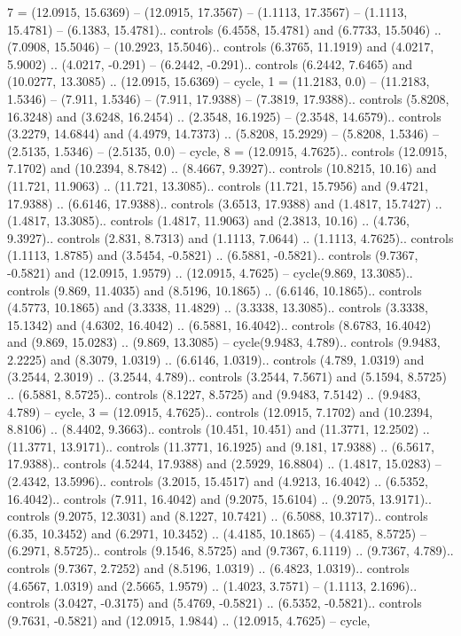 {7} = {(12.0915, 15.6369) -- (12.0915, 17.3567) -- (1.1113, 17.3567) -- (1.1113, 15.4781) -- (6.1383, 15.4781).. controls (6.4558, 15.4781) and (6.7733, 15.5046) .. (7.0908, 15.5046) -- (10.2923, 15.5046).. controls (6.3765, 11.1919) and (4.0217, 5.9002) .. (4.0217, -0.291) -- (6.2442, -0.291).. controls (6.2442, 7.6465) and (10.0277, 13.3085) .. (12.0915, 15.6369) -- cycle},
{1} = {(11.2183, 0.0) -- (11.2183, 1.5346) -- (7.911, 1.5346) -- (7.911, 17.9388) -- (7.3819, 17.9388).. controls (5.8208, 16.3248) and (3.6248, 16.2454) .. (2.3548, 16.1925) -- (2.3548, 14.6579).. controls (3.2279, 14.6844) and (4.4979, 14.7373) .. (5.8208, 15.2929) -- (5.8208, 1.5346) -- (2.5135, 1.5346) -- (2.5135, 0.0) -- cycle},
{8} = {(12.0915, 4.7625).. controls (12.0915, 7.1702) and (10.2394, 8.7842) .. (8.4667, 9.3927).. controls (10.8215, 10.16) and (11.721, 11.9063) .. (11.721, 13.3085).. controls (11.721, 15.7956) and (9.4721, 17.9388) .. (6.6146, 17.9388).. controls (3.6513, 17.9388) and (1.4817, 15.7427) .. (1.4817, 13.3085).. controls (1.4817, 11.9063) and (2.3813, 10.16) .. (4.736, 9.3927).. controls (2.831, 8.7313) and (1.1113, 7.0644) .. (1.1113, 4.7625).. controls (1.1113, 1.8785) and (3.5454, -0.5821) .. (6.5881, -0.5821).. controls (9.7367, -0.5821) and (12.0915, 1.9579) .. (12.0915, 4.7625) -- cycle(9.869, 13.3085).. controls (9.869, 11.4035) and (8.5196, 10.1865) .. (6.6146, 10.1865).. controls (4.5773, 10.1865) and (3.3338, 11.4829) .. (3.3338, 13.3085).. controls (3.3338, 15.1342) and (4.6302, 16.4042) .. (6.5881, 16.4042).. controls (8.6783, 16.4042) and (9.869, 15.0283) .. (9.869, 13.3085) -- cycle(9.9483, 4.789).. controls (9.9483, 2.2225) and (8.3079, 1.0319) .. (6.6146, 1.0319).. controls (4.789, 1.0319) and (3.2544, 2.3019) .. (3.2544, 4.789).. controls (3.2544, 7.5671) and (5.1594, 8.5725) .. (6.5881, 8.5725).. controls (8.1227, 8.5725) and (9.9483, 7.5142) .. (9.9483, 4.789) -- cycle},
{3} = {(12.0915, 4.7625).. controls (12.0915, 7.1702) and (10.2394, 8.8106) .. (8.4402, 9.3663).. controls (10.451, 10.451) and (11.3771, 12.2502) .. (11.3771, 13.9171).. controls (11.3771, 16.1925) and (9.181, 17.9388) .. (6.5617, 17.9388).. controls (4.5244, 17.9388) and (2.5929, 16.8804) .. (1.4817, 15.0283) -- (2.4342, 13.5996).. controls (3.2015, 15.4517) and (4.9213, 16.4042) .. (6.5352, 16.4042).. controls (7.911, 16.4042) and (9.2075, 15.6104) .. (9.2075, 13.9171).. controls (9.2075, 12.3031) and (8.1227, 10.7421) .. (6.5088, 10.3717).. controls (6.35, 10.3452) and (6.2971, 10.3452) .. (4.4185, 10.1865) -- (4.4185, 8.5725) -- (6.2971, 8.5725).. controls (9.1546, 8.5725) and (9.7367, 6.1119) .. (9.7367, 4.789).. controls (9.7367, 2.7252) and (8.5196, 1.0319) .. (6.4823, 1.0319).. controls (4.6567, 1.0319) and (2.5665, 1.9579) .. (1.4023, 3.7571) -- (1.1113, 2.1696).. controls (3.0427, -0.3175) and (5.4769, -0.5821) .. (6.5352, -0.5821).. controls (9.7631, -0.5821) and (12.0915, 1.9844) .. (12.0915, 4.7625) -- cycle},
